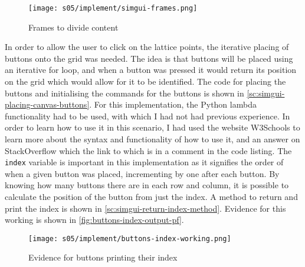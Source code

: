     \begin{figure}[!ht]
        \centering
        \texttt{[image: s05/implement/simgui-frames.png]}
        \caption{Frames to divide content}
        \label{fig:frames-proof}
    \end{figure}



    In order to allow the user to click on the lattice points, the iterative placing of buttons onto the grid was needed. 
    The idea is that buttons will be placed using an iterative for loop, and when a button was pressed it would return its position on the grid which would allow for it to be identified. 
    The code for placing the buttons and initialising the commands for the buttons is shown in \autoref{sc:simgui-placing-canvas-buttons}.
    For this implementation, the Python lambda functionality had to be used, with which I had not had previous experience. 
    In order to learn how to use it in this scenario, I had used the website W3Schools to learn more about the syntax and functionality of how to use it, and an answer on StackOverflow which the link to which is in a comment in the code listing. 
    The \verb|index| variable is important in this implementation as it signifies the order of when a given button was placed, incrementing by one after each button. 
    By knowing how many buttons there are in each row and column, it is possible to calculate the position of the button from just the index. 
    A method to return and print the index is shown in \autoref{sc:simgui-return-index-method}.
    Evidence for this working is shown in \autoref{fig:buttons-index-output-pf}. 

    \begin{figure}[!ht]
        \centering
        \texttt{[image: s05/implement/buttons-index-working.png]}
        \caption{Evidence for buttons printing their index}
        \label{fig:buttons-index-output-pf}
    \end{figure}

